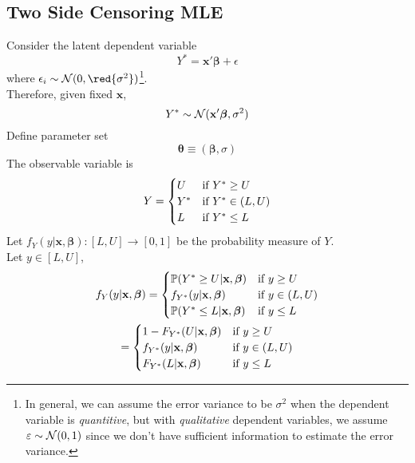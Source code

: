 \documentclass[11pt]{article}
\newcommand{\bm}[1]{\boldsymbol{#1}}
\begin{document}
		\subsection{Two Side Censoring MLE}
		\par Consider the latent dependent variable
		\begin{equation}
			Y^* = \textbf{x}' \bm{\beta} + \epsilon
		\end{equation}
		where $\epsilon_i \sim \mc{N}(0, \red{\sigma^2})$\footnote{In general, we can assume the error variance to be $\sigma^2$ when the dependent variable is \emph{quantitive}, but with \emph{qualitative} dependent variables, we assume $\varepsilon \sim \mathcal{{N}}(0, 1)$ since we don't have sufficient information to estimate the error variance.}. \\
		Therefore, given fixed $\textbf{x}$,
		\begin{equation}
			Y^* \sim \mc{N}(\textbf{x}' \bm{\beta}, \sigma^2)
		\end{equation}
		Define parameter set 
		\begin{equation}
			\bm{\theta} \equiv (\bm{\beta}, \sigma)
		\end{equation}
		The observable variable is 
		\begin{gather}
			Y = \begin{cases}
				U &\text{{if }} Y^* \geq U \\
				Y^* &\text{{if }} Y^* \in (L, U) \\
				L &\text{{if }} Y^* \leq L
			\end{cases}
		\end{gather}
		Let $f_Y(y|\textbf{x}, \bm{\beta}): [L, U] \to [0, 1]$ be the probability measure of $Y$. \\
		Let $y \in [L, U]$, 
		\begin{gather}
			f_Y(y|\textbf{x}, \bm{\beta}) = \begin{cases}
				\mathbb{P}(Y^* \geq U|\textbf{x}, \bm{\beta}) &\tx{if } y \geq U \\
				f_{Y^*}(y|\textbf{x}, \bm{\beta}) &\tx{if } y \in (L, U) \\
				\mathbb{P}(Y^* \leq L|\textbf{x}, \bm{\beta}) &\tx{if } y \leq L
			\end{cases} \\
			= \begin{cases}
				1 - F_{Y^*}(U|\textbf{x}, \bm{\beta}) &\tx{if } y \geq U \\
				f_{Y^*}(y|\textbf{x}, \bm{\beta}) &\tx{if } y \in (L, U) \\
				F_{Y^*}(L|\textbf{x}, \bm{\beta}) &\tx{if } y \leq L
			\end{cases}
		\end{gather}
\end{document}
